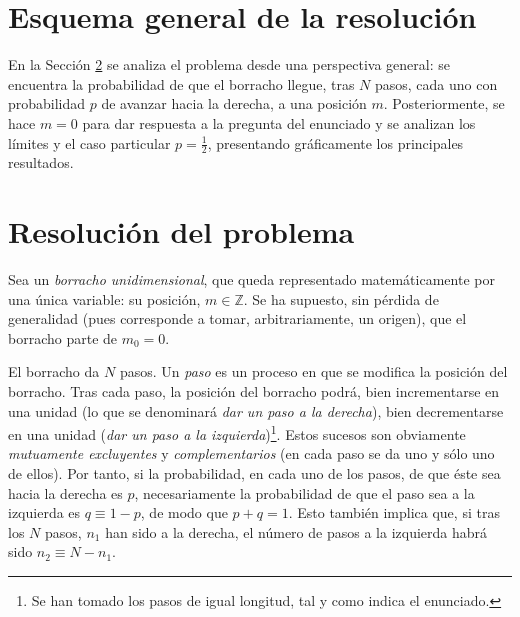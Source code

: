 \section{Esquema general de la resolución}

En la Sección \ref{sec:a} se analiza el problema desde una perspectiva general: se encuentra la probabilidad de que el borracho llegue, tras $N$ pasos, cada uno con probabilidad $p$ de avanzar hacia la derecha, a una posición $m$. Posteriormente, se hace $m = 0$ para dar respuesta a la pregunta del enunciado y se analizan los límites y el caso particular $p = \frac{1}{2}$, presentando gráficamente los principales resultados.

\section{Resolución del problema}
\label{sec:a}
Sea un \textit{borracho unidimensional}, que queda representado matemáticamente por una única variable: su posición, $m \in \mathbb Z$. Se ha supuesto, sin pérdida de generalidad (pues corresponde a tomar, arbitrariamente, un origen), que el borracho parte de $m_0 = 0$. 

El borracho da $N$ pasos. Un \textit{paso} es un proceso en que se modifica la posición del borracho. Tras cada paso, la posición del borracho podrá, bien incrementarse en una unidad (lo que se denominará \textit{dar un paso a la derecha}), bien decrementarse en una unidad (\textit{dar un paso a la izquierda})\footnote{Se han tomado los pasos de igual longitud, tal y como indica el enunciado.}. Estos sucesos son obviamente \textit{mutuamente excluyentes} y \textit{complementarios} (en cada paso se da uno y sólo uno de ellos). Por tanto, si la probabilidad, en cada uno de los pasos, de que éste sea hacia la derecha es $p$, necesariamente la probabilidad de que el paso sea a la izquierda es $q \equiv 1 - p$, de modo que $p + q = 1$. Esto también implica que, si tras los $N$ pasos, $n_1$ han sido a la derecha, el número de pasos a la izquierda habrá sido $n_2 \equiv N - n_1$.

